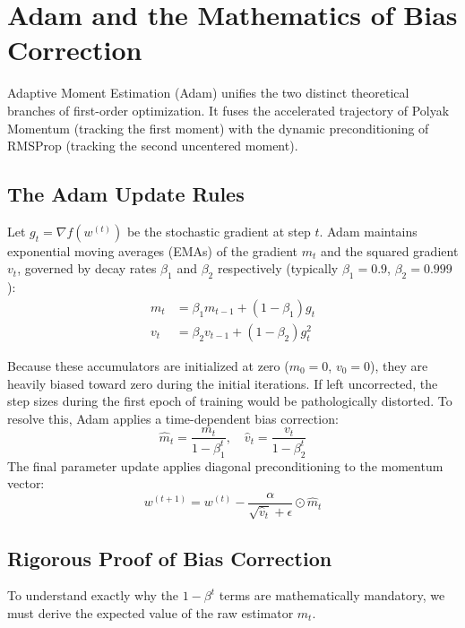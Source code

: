 \section{Adam and the Mathematics of Bias Correction}
\label{sec:adam}

Adaptive Moment Estimation (Adam) \cite{kingma2014adam} unifies the two distinct theoretical branches of first-order optimization. It fuses the accelerated trajectory of Polyak Momentum (tracking the first moment) with the dynamic preconditioning of RMSProp (tracking the second uncentered moment). 

\subsection{The Adam Update Rules}
Let $g_t = \nabla f(w^{(t)})$ be the stochastic gradient at step $t$. Adam maintains exponential moving averages (EMAs) of the gradient $m_t$ and the squared gradient $v_t$, governed by decay rates $\beta_1$ and $\beta_2$ respectively (typically $\beta_1 = 0.9$, $\beta_2 = 0.999$):
\begin{align}
    m_t &= \beta_1 m_{t-1} + (1 - \beta_1) g_t \\
    v_t &= \beta_2 v_{t-1} + (1 - \beta_2) g_t^2
\end{align}

Because these accumulators are initialized at zero ($m_0 = 0$, $v_0 = 0$), they are heavily biased toward zero during the initial iterations. If left uncorrected, the step sizes during the first epoch of training would be pathologically distorted. To resolve this, Adam applies a time-dependent bias correction:
\begin{equation}
    \hat{m}_t = \frac{m_t}{1 - \beta_1^t}, \quad \hat{v}_t = \frac{v_t}{1 - \beta_2^t}
\end{equation}
The final parameter update applies diagonal preconditioning to the momentum vector:
\begin{equation}
    w^{(t+1)} = w^{(t)} - \frac{\alpha}{\sqrt{\hat{v}_t} + \epsilon} \odot \hat{m}_t
\end{equation}

\subsection{Rigorous Proof of Bias Correction}
To understand exactly why the $1 - \beta^t$ terms are mathematically mandatory, we must derive the expected value of the raw estimator $m_t$. 

